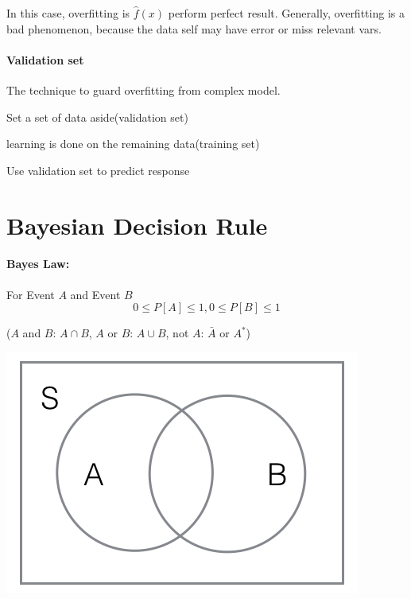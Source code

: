 \documentclass{article}
\begin{document}
{{{{            In this case, overfitting is $\hat{f}(x)$ perform perfect result. Generally, overfitting is a bad phenomenon, because the data self may have error or miss relevant vars.

            \paragraph{Validation set}{
                The technique to guard overfitting from complex model.\\
                \begin{enumerate}{
                    \item Set a set of data aside(validation set)
                    \item learning is done on the remaining data(training set)
                    \item Use validation set to predict response
                }
                \end{enumerate}
            }
        }
    }
}

\section{Bayesian Decision Rule}{
    \paragraph{Bayes Law:}{
        For Event $A$ and Event $B$
        \[0 \le P[A] \le 1, 0 \le P[B] \le 1 \]

        \begin{center}{
            ($A$ and $B$: $A \cap B$, $A$ or $B$: $A \cup B$, not $A$: $\bar{A}$ or $A^*$)
        }
        \end{center}

        \begin{center}{
            \includegraphics[scale=0.5]{bayes.png}
        }
        \end{center}

}}}
\end{document}
